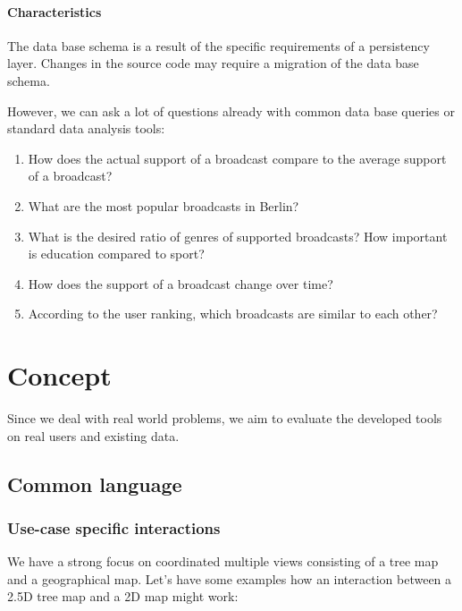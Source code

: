 \documentclass{article}
\newcommand{\map}{\textsc{2D} map}
\newcommand{\tmap}{\textsc{2.5D} tree map}
\begin{document}
\paragraph{Characteristics}
The data base schema is a result of the specific requirements of a persistency layer.
Changes in the source code may require a migration of the data base schema.

However, we can ask a lot of questions already with common data base queries or standard data analysis tools:
\begin{enumerate}
  \item
    How does the actual support of a broadcast compare to the average support of a broadcast?
  \item
    What are the most popular broadcasts in Berlin?
  \item
    What is the desired ratio of genres of supported broadcasts? How important is education compared to sport?
  \item
    How does the support of a broadcast change over time?
  \item
    According to the user ranking, which broadcasts are similar to each other?
\end{enumerate}


\clearpage

\section{Concept}

Since we deal with real world problems, we aim to evaluate the developed tools on real users and existing data.

\subsection{Common language}

\subsubsection{Use-case specific interactions}



We have a strong focus on coordinated multiple views consisting of a tree map and a geographical map.
Let's have some examples how an interaction between a \tmap{} and a \map{} might work:
\end{document}
